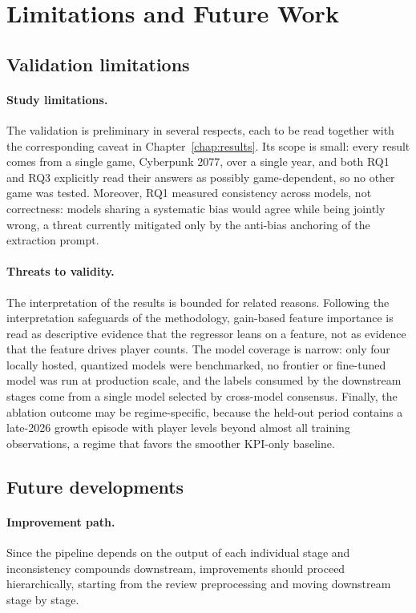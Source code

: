 \section{Limitations and Future Work}
\label{sec:future_work}

\subsection{Validation limitations}
\label{sec:limitations}

\paragraph{Study limitations.} The validation is preliminary in several respects, each to be read together with the corresponding caveat in Chapter~\ref{chap:results}. Its scope is small: every result comes from a single game, Cyberpunk 2077, over a single year, and both RQ1 and RQ3 explicitly read their answers as possibly game-dependent, so no other game was tested. Moreover, RQ1 measured consistency across models, not correctness: models sharing a systematic bias would agree while being jointly wrong, a threat currently mitigated only by the anti-bias anchoring of the extraction prompt.

\paragraph{Threats to validity.} The interpretation of the results is bounded for related reasons. Following the interpretation safeguards of the methodology, gain-based feature importance is read as descriptive evidence that the regressor leans on a feature, not as evidence that the feature drives player counts. The model coverage is narrow: only four locally hosted, quantized models were benchmarked, no frontier or fine-tuned model was run at production scale, and the labels consumed by the downstream stages come from a single model selected by cross-model consensus. Finally, the ablation outcome may be regime-specific, because the held-out period contains a late-2026 growth episode with player levels beyond almost all training observations, a regime that favors the smoother KPI-only baseline.

\subsection{Future developments}
\label{sec:future_developments}

\paragraph{Improvement path.} Since the pipeline depends on the output of each individual stage and inconsistency compounds downstream, improvements should proceed hierarchically, starting from the review preprocessing and moving downstream stage by stage.

